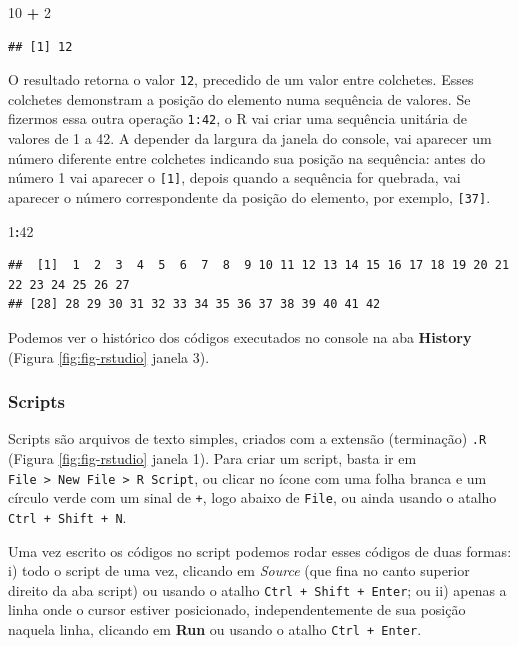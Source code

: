 \documentclass[
]{article}
\newenvironment{Shaded}{\begin{snugshade}}{\end{snugshade}}
\newcommand{\DecValTok}[1]{\textcolor[rgb]{0.00,0.00,0.81}{#1}}
\newcommand{\SpecialCharTok}[1]{\textcolor[rgb]{0.81,0.36,0.00}{\textbf{#1}}}
\begin{document}
\begin{Shaded}
\begin{Highlighting}[]
\DecValTok{10} \SpecialCharTok{+} \DecValTok{2}
\end{Highlighting}
\end{Shaded}

\begin{verbatim}
## [1] 12
\end{verbatim}

O resultado retorna o valor \texttt{12}, precedido de um valor entre colchetes. Esses colchetes demonstram a posição do elemento numa sequência de valores. Se fizermos essa outra operação \texttt{1:42}, o R vai criar uma sequência unitária de valores de 1 a 42. A depender da largura da janela do console, vai aparecer um número diferente entre colchetes indicando sua posição na sequência: antes do número 1 vai aparecer o \texttt{{[}1{]}}, depois quando a sequência for quebrada, vai aparecer o número correspondente da posição do elemento, por exemplo, \texttt{{[}37{]}}.

\begin{Shaded}
\begin{Highlighting}[]
\DecValTok{1}\SpecialCharTok{:}\DecValTok{42}
\end{Highlighting}
\end{Shaded}

\begin{verbatim}
##  [1]  1  2  3  4  5  6  7  8  9 10 11 12 13 14 15 16 17 18 19 20 21 22 23 24 25 26 27
## [28] 28 29 30 31 32 33 34 35 36 37 38 39 40 41 42
\end{verbatim}

Podemos ver o histórico dos códigos executados no console na aba \textbf{History} (Figura \ref{fig:fig-rstudio} janela 3).

\hypertarget{scripts}{%
\subsubsection{Scripts}\label{scripts}}

Scripts são arquivos de texto simples, criados com a extensão (terminação) \texttt{.R} (Figura \ref{fig:fig-rstudio} janela 1). Para criar um script, basta ir em \texttt{File\ \textgreater{}\ New\ File\ \textgreater{}\ R\ Script}, ou clicar no ícone com uma folha branca e um círculo verde com um sinal de \texttt{+}, logo abaixo de \texttt{File}, ou ainda usando o atalho \texttt{Ctrl\ +\ Shift\ +\ N}.

Uma vez escrito os códigos no script podemos rodar esses códigos de duas formas: i) todo o script de uma vez, clicando em \emph{Source} (que fina no canto superior direito da aba script) ou usando o atalho \texttt{Ctrl\ +\ Shift\ +\ Enter}; ou ii) apenas a linha onde o cursor estiver posicionado, independentemente de sua posição naquela linha, clicando em \textbf{Run} ou usando o atalho \texttt{Ctrl\ +\ Enter}.
\end{document}
